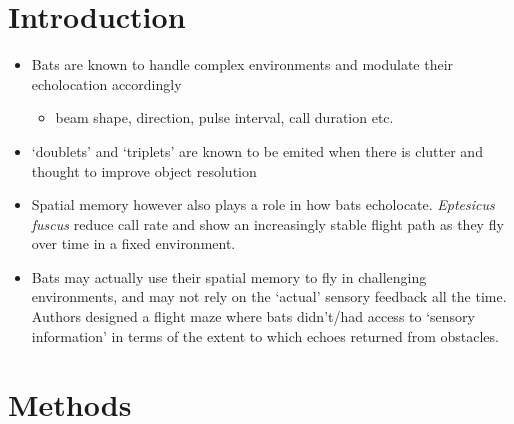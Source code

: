 \documentclass[
]{book}
\providecommand{\tightlist}{%
  \setlength{\itemsep}{0pt}\setlength{\parskip}{0pt}}
\begin{document}
\hypertarget{introduction-13}{%
\section{Introduction}\label{introduction-13}}

\begin{itemize}
\tightlist
\item
  Bats are known to handle complex environments and modulate their echolocation accordingly

  \begin{itemize}
  \tightlist
  \item
    beam shape, direction, pulse interval, call duration etc.
  \end{itemize}
\item
  `doublets' and `triplets' are known to be emited when there is clutter and thought to improve object resolution
\item
  Spatial memory however also plays a role in how bats echolocate. \emph{Eptesicus fuscus} reduce call rate and show an increasingly stable flight path as they fly over time in a fixed environment.
\item
  Bats may actually use their spatial memory to fly in challenging environments, and may not rely on the `actual' sensory feedback all the time. Authors designed a flight maze where bats didn't/had access to `sensory information' in terms of the extent to which echoes returned from obstacles.
\end{itemize}

\hypertarget{methods-12}{%
\section{Methods}\label{methods-12}}
\end{document}

